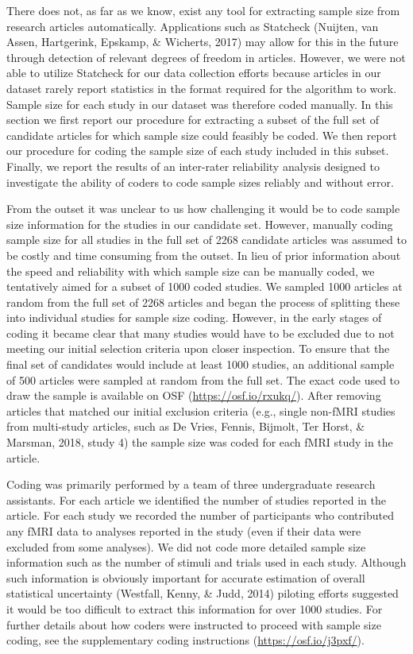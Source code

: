 \documentclass[
  english,
  man,floatsintext]{apa6}
\begin{document}
There does not, as far as we know, exist any tool for extracting sample size from research articles automatically. Applications such as Statcheck (Nuijten, van Assen, Hartgerink, Epskamp, \& Wicherts, 2017) may allow for this in the future through detection of relevant degrees of freedom in articles. However, we were not able to utilize Statcheck for our data collection efforts because articles in our dataset rarely report statistics in the format required for the algorithm to work. Sample size for each study in our dataset was therefore coded manually. In this section we first report our procedure for extracting a subset of the full set of candidate articles for which sample size could feasibly be coded. We then report our procedure for coding the sample size of each study included in this subset. Finally, we report the results of an inter-rater reliability analysis designed to investigate the ability of coders to code sample sizes reliably and without error.

From the outset it was unclear to us how challenging it would be to code sample size information for the studies in our candidate set. However, manually coding sample size for all studies in the full set of 2268 candidate articles was assumed to be costly and time consuming from the outset. In lieu of prior information about the speed and reliability with which sample size can be manually coded, we tentatively aimed for a subset of 1000 coded studies. We sampled 1000 articles at random from the full set of 2268 articles and began the process of splitting these into individual studies for sample size coding. However, in the early stages of coding it became clear that many studies would have to be excluded due to not meeting our initial selection criteria upon closer inspection. To ensure that the final set of candidates would include at least 1000 studies, an additional sample of 500 articles were sampled at random from the full set. The exact code used to draw the sample is available on OSF (\url{https://osf.io/rxukq/}). After removing articles that matched our initial exclusion criteria (e.g., single non-fMRI studies from multi-study articles, such as De Vries, Fennis, Bijmolt, Ter Horst, \& Marsman, 2018, study 4) the sample size was coded for each fMRI study in the article.

Coding was primarily performed by a team of three undergraduate research assistants. For each article we identified the number of studies reported in the article. For each study we recorded the number of participants who contributed any fMRI data to analyses reported in the study (even if their data were excluded from some analyses). We did not code more detailed sample size information such as the number of stimuli and trials used in each study. Although such information is obviously important for accurate estimation of overall statistical uncertainty (Westfall, Kenny, \& Judd, 2014) piloting efforts suggested it would be too difficult to extract this information for over 1000 studies. For further details about how coders were instructed to proceed with sample size coding, see the supplementary coding instructions (\url{https://osf.io/j3pxf/}).
\end{document}
